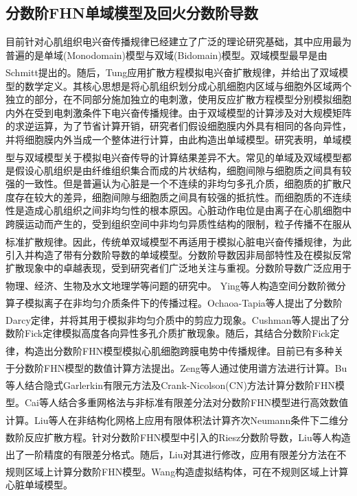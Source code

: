 \documentclass[twoside,UTF8]{nputhesis}
\newcommand{\upcite}[1]{\textsuperscript{\textsuperscript{\cite{#1}}}}
\begin{document}
\subsection{分数阶FHN单域模型及回火分数阶导数} 

目前针对心肌组织电兴奋传播规律已经建立了广泛的理论研究基础，其中应用最为普遍的是单域(Monodomain)模型与双域(Bidomain)模型。双域模型最早是由Schmitt提出的\upcite{schmitt1969biological}。随后，Tung\upcite{tung1978bi}应用扩散方程模拟电兴奋扩散规律，并给出了双域模型的数学定义。其核心思想是将心肌组织划分成心肌细胞内区域与细胞外区域两个独立的部分，在不同部分施加独立的电刺激，使用反应扩散方程模型分别模拟细胞内外在受到电刺激条件下电兴奋传播规律。由于双域模型的计算涉及对大规模矩阵的求逆运算，为了节省计算开销，研究者们假设细胞膜内外具有相同的各向异性，并将细胞膜内外当成一个整体进行计算，由此构造出单域模型。研究表明，单域模型与双域模型关于模拟电兴奋传导的计算结果差异不大\upcite{potse2006comparison}。常见的单域及双域模型都是假设心肌组织是由纤维组织集合而成的片状结构，细胞间隙与细胞质之间具有较强的一致性。但是普遍认为心脏是一个不连续的非均匀多孔介质，细胞质的扩散尺度存在较大的差异，细胞间隙与细胞质之间具有较强的抵抗性。而细胞质的不连续性是造成心肌组织之间非均匀性的根本原因。心脏动作电位是由离子在心肌细胞中跨膜运动而产生的，受到组织空间中非均匀异质性结构的限制，粒子传播不在服从标准扩散规律\upcite{bueno2014fourier}。因此，传统单双域模型不再适用于模拟心脏电兴奋传播规律\upcite{ying2005multilevel, bueno2014fractional}，为此引入并构造了带有分数阶导数的单域模型。分数阶导数因非局部特性及在模拟反常扩散现象中的卓越表现，受到研究者们广泛地关注与重视。分数阶导数广泛应用于物理\upcite{rudolf2000applications,magdziarz2007fractional,mainardi2010fractional,
	metzler2000random,metzler2004restaurant,piryatinska2005models,
	tarasov2008fractional}、经济\upcite{gorenflo2001fractional,jurlewicz2009coupled,
mainardi2000fractional,meerschaert2006coupled,scalas2000fractional,
scalas2006five}、生物\upcite{baeumer2007fractional,barkai2012single,fedotov2007migration,
jeon2012anomalous}及水文地理学\upcite{baeumer2001subordinated,benson2000application,benson2001fractional,
cushman2000fractional,deng2006parameter,schumer2001eulerian}等问题的研究中。
Ying等人\upcite{ying2005multilevel}构造空间分数阶微分算子模拟离子在非均匀介质条件下的传播过程。Ochaoa-Tapia等人\upcite{valdes2006effective}提出了分数阶Darcy定律，并将其用于模拟非均匀介质中的剪应力现象。Cushman等人\upcite{cushman1994nonequilibrium}提出了分数阶Fick定律模拟高度各向异性多孔介质扩散现象。随后，其结合分数阶Fick定律，构造出分数阶FHN模型模拟心肌细胞跨膜电势中传播规律\upcite{liu2013numerical,liu2013numerical1}。目前已有多种关于分数阶FHN模型的数值计算方法提出。Zeng等人\upcite{zeng2014crank}通过使用谱方法进行计算。Bu等人\upcite{bu2014galerkin,bu2015finite}结合隐式Garlerkin有限元方法及Crank-Nicolson(CN)方法计算分数阶FHN模型。Cai等人\upcite{Guo2018Nonstandard}结合多重网格法与非标准有限差分法对分数阶FHN模型进行高效数值计算。Liu等人\upcite{liu2002unstructured,liu2003two,LiuA}在非结构化网格上应用有限体积法计算齐次Neumann条件下二维分数阶反应扩散方程。针对分数阶FHN模型中引入的Riesz分数阶导数，Liu等人\upcite{liu2013numerical}构造出了一阶精度的有限差分格式。随后，Liu\upcite{liu2015semi}对其进行修改，应用有限差分方法在不规则区域上计算分数阶FHN模型。Wang\upcite{wang2019simulation}构造虚拟结构体，可在不规则区域上计算心脏单域模型。
\end{document}
